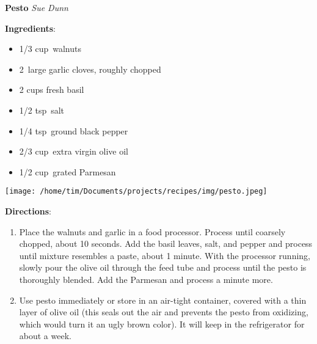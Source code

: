 \documentclass[11pt, twoside, openany]{book}
\begin{document}
\noindent\begin{minipage}[t]{\linewidth}%
{\Large\textbf{Pesto}} \label{pesto}\hfill\textit{Sue Dunn}\\
\noindent\begin{minipage}[t]{0.78\linewidth}%
\textbf{Ingredients}:\vspace{-3mm}
\begin{multicols}{2}
\begin{itemize}\setlength\itemsep{-1mm}
\item 1/3 cup walnuts
\item 2 large garlic cloves, roughly chopped
\item 2 cups fresh basil
\item 1/2 tsp salt
\item 1/4 tsp ground black pepper
\item 2/3 cup extra virgin olive oil
\item 1/2 cup grated Parmesan
\end{itemize}
\end{multicols}
\end{minipage}
\noindent\begin{minipage}[t]{0.18\linewidth}
\centering \strut\vspace*{-\baselineskip}\newline
\texttt{[image: /home/tim/Documents/projects/recipes/img/pesto.jpeg]}\\
\end{minipage}\vspace{3mm}
\textbf{Directions}:
\vspace{-3mm}\begin{enumerate}\setlength\itemsep{-1mm}
\item Place the walnuts and garlic in a food processor. Process until coarsely chopped, about 10 seconds. Add the basil leaves, salt, and pepper and process until mixture resembles a paste, about 1 minute. With the processor running, slowly pour the olive oil through the feed tube and process until the pesto is thoroughly blended. Add the Parmesan and process a minute more.
\item Use pesto immediately or store in an air-tight container, covered with a thin layer of olive oil (this seals out the air and prevents the pesto from oxidizing, which would turn it an ugly brown color). It will keep in the refrigerator for about a week.
\end{enumerate}
\end{minipage}\vspace{8mm}
\end{document}
